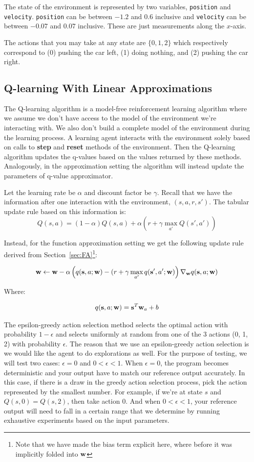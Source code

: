 The state of the environment is represented by two variables, \texttt{position} and \texttt{velocity}. \texttt{position} can be between $-1.2$ and $0.6$ inclusive and \texttt{velocity} can be between $-0.07$ and $0.07$ inclusive. These are just measurements along the $x$-axis.

The actions that you may take at any state are $\{0, 1, 2\}$ which respectively correspond to (0) pushing the car left, (1) doing nothing, and (2) pushing the car right.

\subsection{Q-learning With Linear Approximations}
The Q-learning algorithm is a model-free reinforcement learning algorithm where we assume we don't have access to the model of the environment we're interacting with. We also don't build a complete model of the environment during the learning process. A learning agent interacts with the environment solely based on calls to \textbf{step} and \textbf{reset} methods of the environment. Then the Q-learning algorithm updates the q-values based on the values returned by these methods. Analogously, in the approximation setting the algorithm will instead update the parameters of q-value approximator.


Let the learning rate be $\alpha$ and discount factor be $\gamma$. Recall that we have the information after one interaction with the environment, $(s, a, r, s')$. The tabular update rule based on this information is: 
\[
    Q(s,a) = (1 - \alpha) Q(s, a) + \alpha \left(r + \gamma \max_{a'} Q(s', a')\right)
\]

Instead, for the function approximation setting we get the following update rule derived from Section~\ref{sec:FA}\footnote{Note that we have made the bias term explicit here, where before it was implicitly folded into $\mathbf{w}$ }:

\[
\mathbf{w} \leftarrow \mathbf{w} - \alpha \left(q(\mathbf{s}, a; \mathbf{w}) - (r + \gamma \max_{a'} q(\mathbf{s}', a'; \mathbf{w})\right) \nabla_{\mathbf{w}} q(\mathbf{s}, a; \mathbf{w})
\]

Where:

\[
q(\mathbf{s},a;\mathbf{w}) = \mathbf{s}^T \mathbf{w}_a + b
\]

The epsilon-greedy action selection method selects the optimal action with probability $1 - \epsilon$ and selects uniformly at random from one of the 3 actions (0, 1, 2) with probability $\epsilon$. The reason that we use an epsilon-greedy action selection is we would like the agent to do explorations as well. For the purpose of testing, we will test two cases: $\epsilon = 0$ and $0 < \epsilon < 1$. When $\epsilon = 0$, the program becomes deterministic and your output have to match our reference output accurately. In this case, if there is a draw in the greedy action selection process, pick the action represented by the smallest number. For example, if we're at state $s$ and $Q(s, 0) = Q(s, 2)$, then take action $0$. And when $0 < \epsilon < 1$, your reference output will need to fall in a certain range that we determine by running exhaustive experiments based on the input parameters.


